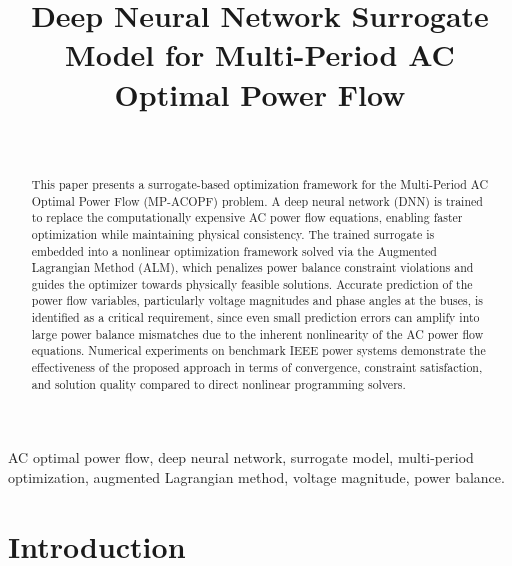 \documentclass[journal]{IEEEtran}
\begin{document}
\title{Deep Neural Network Surrogate Model for Multi-Period AC Optimal Power Flow}

\author{%
  \\
}

\maketitle

\begin{abstract}
This paper presents a surrogate-based optimization framework for the Multi-Period
AC Optimal Power Flow (MP-ACOPF) problem. A deep neural network (DNN) is trained
to replace the computationally expensive AC power flow equations, enabling faster
optimization while maintaining physical consistency. The trained surrogate is
embedded into a nonlinear optimization framework solved via the Augmented Lagrangian
Method (ALM), which penalizes power balance constraint violations and guides the
optimizer towards physically feasible solutions. Accurate prediction of the power
flow variables, particularly voltage magnitudes and phase angles at the buses, is
identified as a critical requirement, since even small prediction errors can amplify
into large power balance mismatches due to the inherent nonlinearity of the AC power
flow equations. Numerical experiments on benchmark IEEE power systems demonstrate
the effectiveness of the proposed approach in terms of convergence, constraint
satisfaction, and solution quality compared to direct nonlinear programming solvers.
\end{abstract}

\begin{IEEEkeywords}
AC optimal power flow, deep neural network, surrogate model, multi-period
optimization, augmented Lagrangian method, voltage magnitude, power balance.
\end{IEEEkeywords}

\section{Introduction}
\label{sec:introduction}
\end{document}
